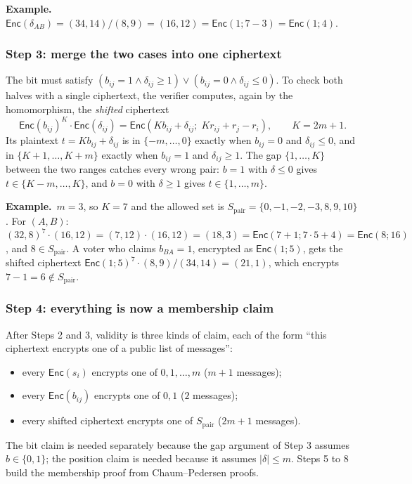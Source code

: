 \documentclass[11pt,a4paper]{article}
\newcommand{\Enc}{\mathsf{Enc}}
\newcommand{\ex}[1]{\par\medskip\noindent\textbf{Example.}~#1\par\medskip}
\theoremstyle{remark}
\begin{document}
\ex{$\Enc(\delta_{AB}) = (34, 14) / (8, 9) = (16, 12) = \Enc(1; 7 - 3) =
\Enc(1; 4)$.}

\subsubsection*{Step 3: merge the two cases into one ciphertext}
The bit must satisfy $(b_{ij} = 1 \wedge \delta_{ij} \ge 1) \vee (b_{ij} =
0 \wedge \delta_{ij} \le 0)$. To check both halves with a single
ciphertext, the verifier computes, again by the homomorphism, the
\emph{shifted} ciphertext
\[
  \Enc(b_{ij})^{K} \cdot \Enc(\delta_{ij}) = \Enc(K b_{ij} + \delta_{ij};\;
  K r_{ij} + r_j - r_i), \qquad K = 2m + 1 .
\]
Its plaintext $t = K b_{ij} + \delta_{ij}$ is in $\{-m, \ldots, 0\}$
exactly when $b_{ij} = 0$ and $\delta_{ij} \le 0$, and in $\{K + 1,
\ldots, K + m\}$ exactly when $b_{ij} = 1$ and $\delta_{ij} \ge 1$. The
gap $\{1, \ldots, K\}$ between the two ranges catches every wrong pair:
$b = 1$ with $\delta \le 0$ gives $t \in \{K - m, \ldots, K\}$, and $b =
0$ with $\delta \ge 1$ gives $t \in \{1, \ldots, m\}$.

\ex{$m = 3$, so $K = 7$ and the allowed set is $S_{\mathrm{pair}} = \{0,
-1, -2, -3, 8, 9, 10\}$. For $(A, B)$: $(32, 8)^7 \cdot (16, 12) = (7, 12)
\cdot (16, 12) = (18, 3) = \Enc(7 + 1; 7 \cdot 5 + 4) = \Enc(8; 16)$, and
$8 \in S_{\mathrm{pair}}$. A voter who claims $b_{BA} = 1$, encrypted as
$\Enc(1; 5)$, gets the shifted ciphertext $\Enc(1; 5)^7 \cdot (8, 9) / (34,
14) = (21, 1)$, which encrypts $7 - 1 = 6 \notin S_{\mathrm{pair}}$.}

\subsubsection*{Step 4: everything is now a membership claim}
After Steps 2 and 3, validity is three kinds of claim, each of the form
``this ciphertext encrypts one of a public list of messages'':
\begin{itemize}[nosep]
  \item every $\Enc(s_i)$ encrypts one of $0, 1, \ldots, m$ ($m + 1$
  messages);
  \item every $\Enc(b_{ij})$ encrypts one of $0, 1$ ($2$ messages);
  \item every shifted ciphertext encrypts one of $S_{\mathrm{pair}}$ ($2m
  + 1$ messages).
\end{itemize}
The bit claim is needed separately because the gap argument of Step 3
assumes $b \in \{0, 1\}$; the position claim is needed because it assumes
$|\delta| \le m$. Steps 5 to 8 build the membership proof from
Chaum--Pedersen proofs.
\end{document}
